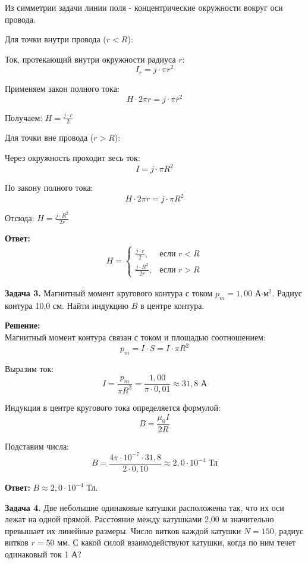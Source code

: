 \documentclass[10pt]{article}
\begin{document}
Из симметрии задачи линии поля - концентрические окружности вокруг оси провода.

Для точки внутри провода ($r < R$):

Ток, протекающий внутри окружности радиуса $r$:
$$I_r = j \cdot \pi r^2$$

Применяем закон полного тока:
$$H \cdot 2\pi r = j \cdot \pi r^2$$

Получаем: $H = \frac{j \cdot r}{2}$

Для точки вне провода ($r > R$): 

Через окружность проходит весь ток:
$$I = j \cdot \pi R^2$$

По закону полного тока:
$$H \cdot 2\pi r = j \cdot \pi R^2$$

Отсюда: $H = \frac{j \cdot R^2}{2r}$

\textbf{Ответ:}
\begin{align*}
H = \begin{cases}
\frac{j \cdot r}{2}, & \text{если } r < R \\
\frac{j \cdot R^2}{2r}, & \text{если } r > R
\end{cases}
\end{align*}

\vspace{0.8cm}

\textbf{Задача 3.} Магнитный момент кругового контура с током $p_m = 1,00$ А$\cdot$м$^2$. Радиус контура 10,0 см. Найти индукцию $B$ в центре контура.

\textbf{Решение:} \\
Магнитный момент контура связан с током и площадью соотношением:
$$p_m = I \cdot S = I \cdot \pi R^2$$

Выразим ток:
$$I = \frac{p_m}{\pi R^2} = \frac{1,00}{\pi \cdot 0,01} \approx 31,8 \text{ А}$$

Индукция в центре кругового тока определяется формулой: 
$$B = \frac{\mu_0 I}{2R}$$

Подставим числа:
$$B = \frac{4\pi \cdot 10^{-7} \cdot 31,8}{2 \cdot 0,10} \approx 2,0 \cdot 10^{-4} \text{ Тл}$$

\textbf{Ответ:} $B \approx 2,0 \cdot 10^{-4}$ Тл.

\vspace{0.8cm}

\textbf{Задача 4.} Две небольшие одинаковые катушки расположены так, что их оси лежат на одной прямой. Расстояние между катушками 2,00 м значительно превышает их линейные размеры. Число витков каждой катушки $N = 150$, радиус витков $r=50$ мм. С какой силой взаимодействуют катушки, когда по ним течет одинаковый ток 1 А?
\end{document}
